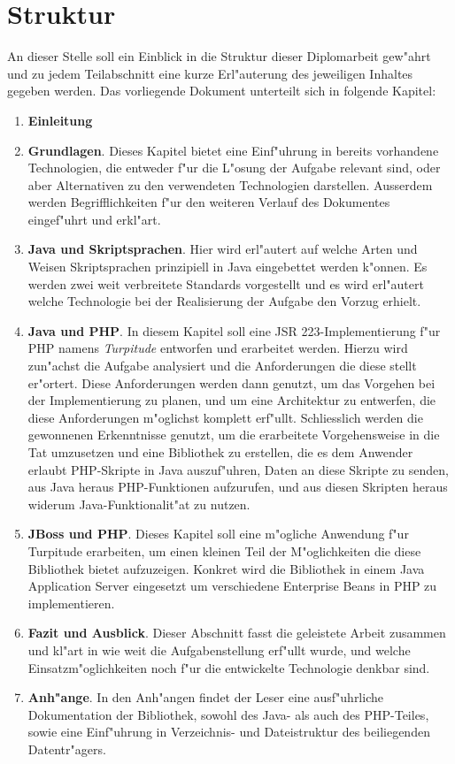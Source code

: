 \clearpage

\section{Struktur}
\label{sec:intro:structure}

An dieser Stelle soll ein Einblick in die Struktur dieser Diplomarbeit gew"ahrt und zu jedem Teilabschnitt eine
kurze Erl"auterung des jeweiligen Inhaltes gegeben werden.
Das vorliegende Dokument unterteilt sich in folgende Kapitel:

\begin{enumerate}
    \item \textbf{Einleitung}
    \item \textbf{Grundlagen}. Dieses Kapitel bietet eine Einf"uhrung in bereits vorhandene Technologien, die entweder
    f"ur die L"osung der Aufgabe relevant sind, oder aber Alternativen zu den verwendeten Technologien darstellen.
    Ausserdem werden Begrifflichkeiten f"ur den weiteren Verlauf des Dokumentes eingef"uhrt und erkl"art.
    \item \textbf{Java und Skriptsprachen}. Hier wird erl"autert auf welche Arten und Weisen Skriptsprachen 
    prinzipiell in Java eingebettet werden k"onnen. Es werden zwei weit verbreitete Standards vorgestellt und es wird
    erl"autert welche Technologie bei der Realisierung der Aufgabe den Vorzug erhielt.
    \item \textbf{Java und PHP}. In diesem Kapitel soll eine JSR 223-Implementierung f"ur PHP namens \emph{Turpitude} 
    entworfen und erarbeitet werden. Hierzu wird zun"achst
    die Aufgabe analysiert und die Anforderungen die diese stellt er"ortert. Diese Anforderungen werden dann genutzt,
    um das Vorgehen bei der Implementierung zu planen, und um eine Architektur zu entwerfen, die diese Anforderungen
    m"oglichst komplett erf"ullt. Schliesslich werden die gewonnenen Erkenntnisse genutzt, um die erarbeitete Vorgehensweise
    in die Tat umzusetzen und eine Bibliothek zu erstellen, die es dem Anwender erlaubt PHP-Skripte in Java auszuf"uhren,
    Daten an diese Skripte zu senden, aus Java heraus PHP-Funktionen aufzurufen, und aus diesen Skripten heraus widerum
    Java-Funktionalit"at zu nutzen.
    \item \textbf{JBoss und PHP}. Dieses Kapitel soll eine m"ogliche Anwendung f"ur Turpitude erarbeiten, 
    um einen kleinen Teil der M"oglichkeiten die diese Bibliothek bietet aufzuzeigen. Konkret wird die Bibliothek
    in einem Java Application Server eingesetzt um verschiedene Enterprise Beans in PHP zu implementieren.
    \item \textbf{Fazit und Ausblick}. Dieser Abschnitt fasst die geleistete Arbeit zusammen und kl"art
    in wie weit die Aufgabenstellung erf"ullt wurde, und welche Einsatzm"oglichkeiten noch f"ur die entwickelte 
    Technologie denkbar sind.
    \item \textbf{Anh"ange}. In den Anh"angen findet der Leser eine ausf"uhrliche Dokumentation der Bibliothek, sowohl des
    Java- als auch des PHP-Teiles, sowie eine Einf"uhrung in Verzeichnis- und Dateistruktur des beiliegenden
    Datentr"agers.
\end{enumerate}



